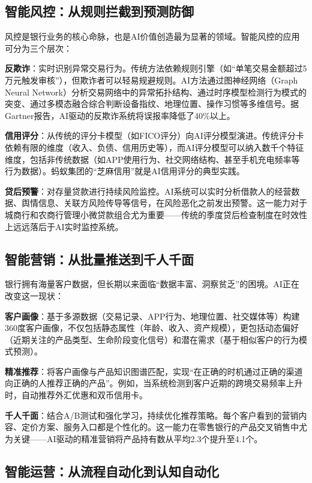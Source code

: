 \subsection{智能风控：从规则拦截到预测防御}

风控是银行业务的核心命脉，也是AI价值创造最为显著的领域。智能风控的应用可分为三个层次：

\textbf{反欺诈}：实时识别异常交易行为。传统方法依赖规则引擎（如``单笔交易金额超过5万元触发审核''），但欺诈者可以轻易规避规则。AI方法通过图神经网络（Graph Neural Network）分析交易网络中的异常拓扑结构、通过时序模型检测行为模式的突变、通过多模态融合综合判断设备指纹、地理位置、操作习惯等多维信号。据Gartner报告，AI驱动的反欺诈系统将误报率降低了40\%以上\parencite{gartner2024banking}。

\textbf{信用评分}：从传统的评分卡模型（如FICO评分）向AI评分模型演进。传统评分卡依赖有限的维度（收入、负债、信用历史等），而AI评分模型可以纳入数千个特征维度，包括非传统数据（如APP使用行为、社交网络结构、甚至手机充电频率等行为数据）。蚂蚁集团的``芝麻信用''就是AI信用评分的典型实践。

\textbf{贷后预警}：对存量贷款进行持续风险监控。AI系统可以实时分析借款人的经营数据、舆情信息、关联方风险传导等信号，在风险恶化之前发出预警。这一能力对于城商行和农商行管理小微贷款组合尤为重要——传统的季度贷后检查制度在时效性上远远落后于AI实时监控系统。

\subsection{智能营销：从批量推送到千人千面}

银行拥有海量客户数据，但长期以来面临``数据丰富、洞察贫乏''的困境。AI正在改变这一现状：

\textbf{客户画像}：基于多源数据（交易记录、APP行为、地理位置、社交媒体等）构建360度客户画像，不仅包括静态属性（年龄、收入、资产规模），更包括动态偏好（近期关注的产品类型、生命阶段变化信号）和潜在需求（基于相似客户的行为模式预测）。

\textbf{精准推荐}：将客户画像与产品知识图谱匹配，实现``在正确的时机通过正确的渠道向正确的人推荐正确的产品''。例如，当系统检测到客户近期的跨境交易频率上升时，自动推荐外汇优惠和双币信用卡。

\textbf{千人千面}：结合A/B测试和强化学习，持续优化推荐策略。每个客户看到的营销内容、定价方案、服务入口都是个性化的。这一能力在零售银行的产品交叉销售中尤为关键——AI驱动的精准营销将产品持有数从平均2.3个提升至4.1个\parencite{pwc2023ai}。

\subsection{智能运营：从流程自动化到认知自动化}

